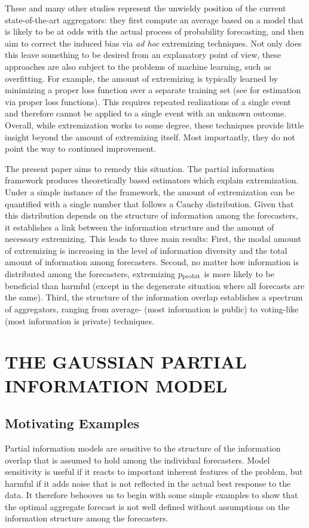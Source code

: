 \documentclass[12pt]{article}
\theoremstyle{definition}
\theoremstyle{definition}
\def\probit{p_{\rm probit}}
\begin{document}
These and many other studies represent the unwieldy position of the
 current state-of-the-art aggregators: they first compute an average 
 based on a model that is
likely to be at odds with the actual process of probability
forecasting, and  then aim to correct the induced bias  via {\em ad hoc}
extremizing techniques.
%
Not only does this leave something to be desired from an explanatory
point of view, these approaches are also subject to the problems of
machine learning, such as overfitting.  For example, the amount of 
extremizing is typically learned by minimizing a
proper loss function over a separate training set (see \citealt{Gneiting04strictlyproper} for estimation via proper loss functions). This requires repeated realizations
of a single event and therefore cannot be applied to a single event with an unknown outcome. Overall, while 
extremization works to some degree, these techniques provide little
insight beyond the amount of extremizing itself. Most importantly, they do not point
the way to continued improvement.

The present paper aims to remedy this situation.  The partial information framework produces theoretically based estimators which
explain extremization. Under a simple instance of the framework, the amount of extremization can be quantified
with a single number that follows a Cauchy distribution.  Given that
this distribution depends on the structure of information among the
forecasters, it establishes a link between the information structure
and the amount of necessary extremizing.  This leads to three main results:  First, the modal
amount of extremizing is increasing in the level of information
diversity and the total amount of information among forecasters.
Second, no matter how information is distributed among the forecasters,
extremizing $\probit$ is more likely to be beneficial
than harmful (except in the degenerate situation where all forecasts
are the same). Third, the structure of the information overlap establishes a spectrum of aggregators, ranging from
average- (most information is public) to voting-like (most information
is private) techniques.

\section{THE GAUSSIAN PARTIAL INFORMATION MODEL}
\label{sec:model}
\subsection{Motivating Examples}
Partial information models are sensitive to the structure of the
information overlap that is assumed to hold among the individual
forecasters. Model sensitivity is useful if it reacts
to important inherent features of the problem, but harmful if it adds
noise that is not reflected in the actual best response to the data.
It therefore behooves us to begin with some simple examples to show
that the optimal aggregate forecast is not well defined without
assumptions on the information structure among the forecasters.
\end{document}
